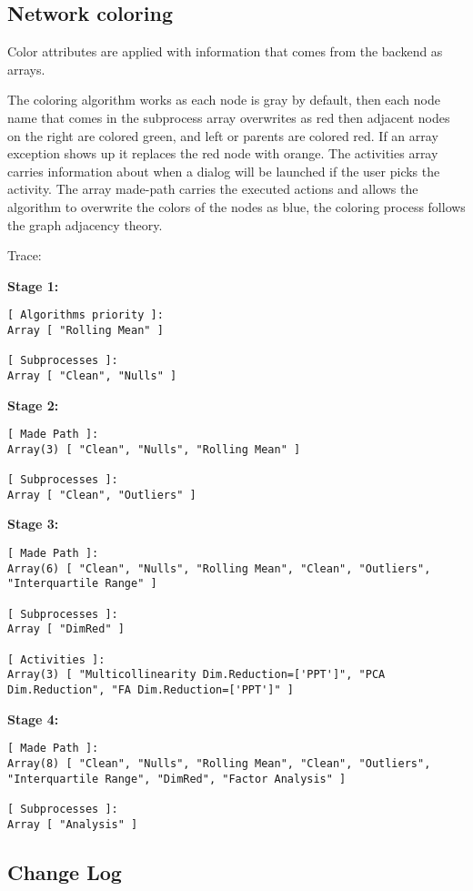 \documentclass[a4paper]{article}
\begin{document}
\subsection{Network coloring}
\label{sec:org63e6dad}

Color attributes are applied with information that comes from the backend as arrays.

The coloring algorithm works as each node is gray by default, then each node name that comes in the subprocess array overwrites as red then adjacent nodes on the right are colored green, and left or parents are colored red. If an array exception shows up it replaces the red node with orange. The activities array carries information about when a dialog will be launched if the user picks the activity. The array made-path carries the executed actions and allows the algorithm to overwrite the colors of the nodes as blue, the coloring process follows the graph adjacency theory.

Trace:

\textbf{Stage 1:}
\begin{verbatim}
[ Algorithms priority ]:  
Array [ "Rolling Mean" ]

[ Subprocesses ]: 
Array [ "Clean", "Nulls" ]
\end{verbatim}

\textbf{Stage 2:}
\begin{verbatim}
[ Made Path ]:  
Array(3) [ "Clean", "Nulls", "Rolling Mean" ]

[ Subprocesses ]: 
Array [ "Clean", "Outliers" ]
\end{verbatim}

\textbf{Stage 3:}
\begin{verbatim}
[ Made Path ]:  
Array(6) [ "Clean", "Nulls", "Rolling Mean", "Clean", "Outliers", "Interquartile Range" ]

[ Subprocesses ]: 
Array [ "DimRed" ]

[ Activities ]:
Array(3) [ "Multicollinearity Dim.Reduction=['PPT']", "PCA Dim.Reduction", "FA Dim.Reduction=['PPT']" ]
\end{verbatim}

\textbf{Stage 4:}
\begin{verbatim}
[ Made Path ]:  
Array(8) [ "Clean", "Nulls", "Rolling Mean", "Clean", "Outliers", "Interquartile Range", "DimRed", "Factor Analysis" ]

[ Subprocesses ]: 
Array [ "Analysis" ]
\end{verbatim}


\subsection{Change Log}
\label{sec:orga7abd76}
\end{document}
